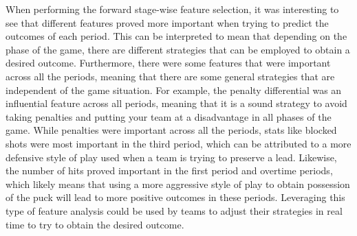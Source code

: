 \documentclass[twocolumn,letterpaper,12pt,notitlepage]{article}
\begin{document}
When performing the forward stage-wise feature selection, it was interesting to see that different features proved more important when trying to predict the outcomes of each period. This can be interpreted to mean that depending on the phase of the game, there are different strategies that can be employed to obtain a desired outcome. Furthermore, there were some features that were important across all the periods, meaning that there are some general strategies that are independent of the game situation. For example, the penalty differential was an influential feature across all periods, meaning that it is a sound strategy to avoid taking penalties and putting your team at a disadvantage in all phases of the game. While penalties were important across all the periods, stats like blocked shots were most important in the third period, which can be attributed to a more defensive style of play used when a team is trying to preserve a lead. Likewise, the number of hits proved important in the first period and overtime periods, which likely means that using a more aggressive style of play to obtain possession of the puck will lead to more positive outcomes in these periods. Leveraging this type of feature analysis could be used by teams to adjust their strategies in real time to try to obtain the desired outcome.


\end{document}
